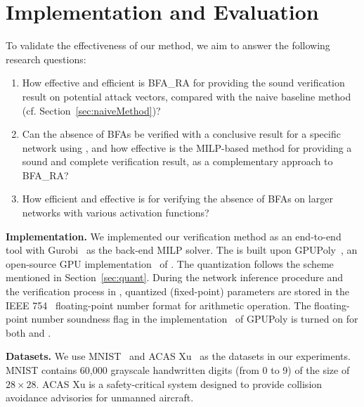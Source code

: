 \section{Implementation and Evaluation}\label{sec:exp}



To validate the effectiveness of our method, we aim to answer the following research questions:

\begin{enumerate}[label=\textbf{RQ\arabic*. },itemindent=*,leftmargin=*,itemsep=0pt]%
    \item How effective and efficient is {\sf BFA\_RA} for providing the sound verification result on potential attack vectors, compared with the naive baseline method (cf. Section~\ref{sec:naiveMethod})?
    
    \item Can the absence of BFAs be verified with a conclusive result for a specific network using \tool, and how effective is the MILP-based method for providing a sound and complete verification result, as a complementary approach to {\sf BFA\_RA}?
    
    \item How efficient and effective is \tool for verifying the absence of BFAs on larger networks with various activation functions?
\end{enumerate}




\noindent
{\bf Implementation.} We implemented our verification method as an end-to-end tool \tool with Gurobi~\cite{Gurobi} as the back-end MILP solver. The \symPoly {} is built upon GPUPoly~\cite{gpupoly}, an open-source GPU implementation~\cite{muellch2023eth} of \deepPoly. The quantization follows the scheme mentioned in Section~\ref{sec:quant}. During the network inference procedure and the verification process in \tool, quantized (fixed-point) parameters are stored in the IEEE 754~\cite{FPIEEE754} floating-point number format for arithmetic operation. The floating-point number soundness flag in the implementation~\cite{muellch2023eth} of GPUPoly \cite{gpupoly} is turned on for both \deepPoly and \symPoly.

\smallskip
\noindent
{\bf Datasets.} We use MNIST~\cite{MNIST} and ACAS Xu~\cite{julian2019deep} as the datasets in our experiments. MNIST contains 60,000 grayscale handwritten digits (from 0 to 9) of the size of $28\times 28$. ACAS Xu is a safety-critical system designed to provide collision avoidance advisories for unmanned aircraft.


